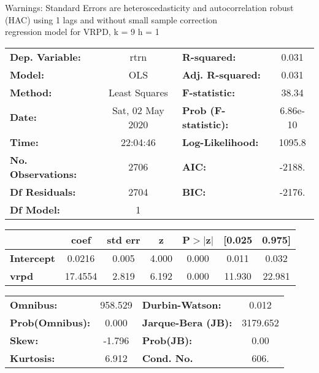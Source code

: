 Warnings: \newline
 [1] Standard Errors are heteroscedasticity and autocorrelation robust (HAC) using 1 lags and without small sample correction\\ 

regression model for VRPD, k = 9 h = 1\begin{center}
\begin{tabular}{lclc}
\toprule
\textbf{Dep. Variable:}    &       rtrn       & \textbf{  R-squared:         } &     0.031   \\
\textbf{Model:}            &       OLS        & \textbf{  Adj. R-squared:    } &     0.031   \\
\textbf{Method:}           &  Least Squares   & \textbf{  F-statistic:       } &     38.34   \\
\textbf{Date:}             & Sat, 02 May 2020 & \textbf{  Prob (F-statistic):} &  6.86e-10   \\
\textbf{Time:}             &     22:04:46     & \textbf{  Log-Likelihood:    } &    1095.8   \\
\textbf{No. Observations:} &        2706      & \textbf{  AIC:               } &    -2188.   \\
\textbf{Df Residuals:}     &        2704      & \textbf{  BIC:               } &    -2176.   \\
\textbf{Df Model:}         &           1      & \textbf{                     } &             \\
\bottomrule
\end{tabular}
\begin{tabular}{lcccccc}
                   & \textbf{coef} & \textbf{std err} & \textbf{z} & \textbf{P$> |$z$|$} & \textbf{[0.025} & \textbf{0.975]}  \\
\midrule
\textbf{Intercept} &       0.0216  &        0.005     &     4.000  &         0.000        &        0.011    &        0.032     \\
\textbf{vrpd}      &      17.4554  &        2.819     &     6.192  &         0.000        &       11.930    &       22.981     \\
\bottomrule
\end{tabular}
\begin{tabular}{lclc}
\textbf{Omnibus:}       & 958.529 & \textbf{  Durbin-Watson:     } &    0.012  \\
\textbf{Prob(Omnibus):} &   0.000 & \textbf{  Jarque-Bera (JB):  } & 3179.652  \\
\textbf{Skew:}          &  -1.796 & \textbf{  Prob(JB):          } &     0.00  \\
\textbf{Kurtosis:}      &   6.912 & \textbf{  Cond. No.          } &     606.  \\
\bottomrule
\end{tabular}
\end{center}

